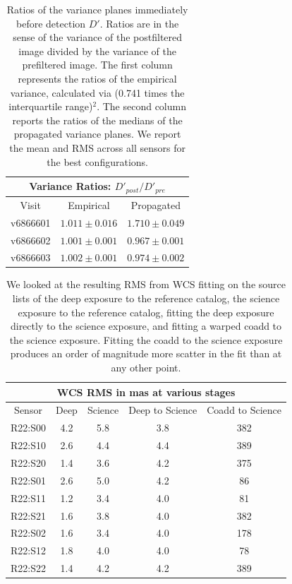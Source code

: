 \documentclass[prd, nofootinbib, floatfix, 11pt,tightenlines,times]{article}
\begin{document}
\begin{table}
\centering
\begin{tabular}{ccc}
\hline
\multicolumn{3}{|c|}{Variance Ratios: $D'_{post} / D'_{pre}$} \\
\hline
Visit    & Empirical & Propagated \\
\hline
v6866601 & $1.011 \pm 0.016$    & $1.710 \pm 0.049$    \\
v6866602 & $1.001 \pm 0.001$    & $0.967 \pm 0.001$    \\
v6866603 & $1.002 \pm 0.001$    & $0.974 \pm 0.002$    \\
\end{tabular}
\caption{Ratios of the variance planes immediately before detection
  $D'$.  Ratios are in the sense of the variance of the postfiltered
  image divided by the variance of the prefiltered image.  The first
  column represents the ratios of the empirical variance, calculated
  via (0.741 times the interquartile range)$^2$.  The second column
  reports the ratios of the medians of the propagated variance planes.
  We report the mean and RMS across all sensors for the best
  configurations.}
\label{tab-variance2}
\end{table}


\clearpage
\begin{table}
\centering
\begin{tabular}{|c|c|c|c|c|}
\hline
\multicolumn{5}{|c|}{WCS RMS in mas at various stages} \\
\hline
Sensor    & Deep & Science &  Deep to Science & Coadd to Science \\
\hline
R22:S00&4.2&5.8&3.8&382\\ 
R22:S10&2.6&4.4&4.4&389\\
R22:S20&1.4&3.6&4.2&375\\
R22:S01&2.6&5.0&4.2&86\\
R22:S11&1.2&3.4&4.0&81\\
R22:S21&1.6&3.8&4.0&382\\
R22:S02&1.6&3.4&4.0&178\\
R22:S12&1.8&4.0&4.0&78\\
R22:S22&1.4&4.2&4.2&389\\
\hline
\end{tabular}
\caption{We looked at the resulting RMS from WCS fitting on the source lists of the deep exposure to the reference catalog, the science exposure to the reference catalog,
fitting the deep exposure directly to the science exposure, and fitting a warped coadd to the science exposure.  Fitting 
the coadd to the science exposure produces an order of magnitude more scatter in the fit than at any other point.\label{tab-wcsrms}}
\end{table}
\clearpage
\end{document}
